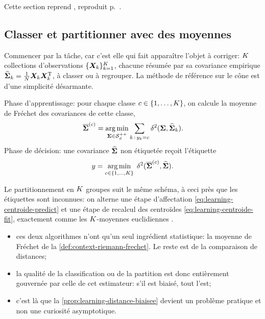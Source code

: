 \begin{contributions}
  Cette section reprend , reproduit p.~.
\end{contributions}

\subsection{Classer et partitionner avec des moyennes}
\label{subsec:learning-centroides}

Commencer par la tâche, car c'est elle qui fait apparaître l'objet à corriger:
$K$ collections d'observations $\{\boldsymbol{X}_k\}_{k=1}^{K}$, chacune
résumée par sa covariance empirique
$\widehat{\boldsymbol{\Sigma}}_k=\frac{1}{N}\boldsymbol{X}_k\boldsymbol{X}_k^{\mathrm{T}}$, à classer ou à regrouper. La
méthode de référence sur le cône est d'une simplicité désarmante.

\begin{definition}
\label{def:learning-centroide}
  Phase d'apprentissage: pour chaque classe $c\in\{1,\dots,K\}$,
  on calcule la moyenne de Fréchet des covariances de cette classe,
  \begin{equation}
    \overline{\boldsymbol{\Sigma}}^{(c)}
    =
    \operatorname*{arg\,min}_{\boldsymbol{\Sigma}\in\mathcal{S}_{d}^{++}}
    \sum_{k\,:\,y_k=c}
    \delta^2(\boldsymbol{\Sigma},\widehat{\boldsymbol{\Sigma}}_k).
    \label{eq:learning-centroide-fit}
  \end{equation}
  Phase de décision: une covariance $\widehat{\boldsymbol{\Sigma}}$ non étiquetée reçoit l'étiquette
  \begin{equation}
    y
    =
    \operatorname*{arg\,min}_{c\in\{1,\dots,K\}}
    \;
    \delta^2(\overline{\boldsymbol{\Sigma}}^{(c)},\widehat{\boldsymbol{\Sigma}}).
    \label{eq:learning-centroide-predict}
  \end{equation}
\end{definition}

Le partitionnement en $K$ groupes suit le même schéma, à ceci près que
les étiquettes sont inconnues: on alterne une étape d'affectation
\cref{eq:learning-centroide-predict} et une étape de recalcul des centroïdes
\cref{eq:learning-centroide-fit}, exactement comme les $K$-moyennes
euclidiennes .

\begin{remark}
\label{rem:learning-tout-repose}
  \begin{itemize}
    \item ces deux algorithmes n'ont qu'un seul ingrédient statistique: la
      moyenne de Fréchet de la \cref{def:context-riemann-frechet}. Le reste est
      de la comparaison de distances;
    \item la qualité de la classification ou de la partition est donc
      entièrement gouvernée par celle de cet estimateur: s'il est biaisé, tout
      l'est;
    \item c'est là que la \cref{prop:learning-distance-biaisee} devient un
      problème pratique et non une curiosité asymptotique.
  \end{itemize}
  \leavevmode
\end{remark}

